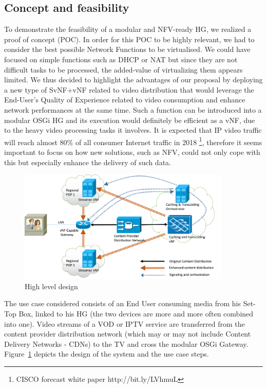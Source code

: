 \subsection{Concept and feasibility}
To demonstrate the feasibility of a modular and NFV-ready HG, we realized a proof of concept (POC).
In order for this POC to be highly relevant, we had to consider the best possible Network Functions to be virtualised.
We could have focused on simple functions such as DHCP or NAT but since they are not difficult tasks to be processed, the added-value of virtualizing them appears limited.
We thus decided to highlight the advantages of our proposal by deploying a new type of SvNF+vNF related to video distribution that would leverage the End-User's Quality of Experience related to video consumption and enhance network performances at the same time.
Such a function can be introduced into a modular OSGi HG and its execution would definitely be efficient as a vNF, due to the heavy video processing tasks it involves.
It is expected that IP video traffic will reach almost 80\% of all consumer Internet traffic in 2018 \footnote{CISCO forecast white paper http://bit.ly/LVhmuL }, therefore it seems important to focus on how new solutions, such as NFV, could not only cope with this but especially enhance the delivery of such data.

\begin{figure}
	
	\center

	\includegraphics[width=0.90\textwidth,natwidth=8132,natheight=4335]{fig/highleveldesign.png}
	\caption{ High level design
    \label{fig:hld}
    }

\end{figure}


The use case considered consists of an End User consuming media from his Set-Top Box, linked to his HG (the two devices are more and more often combined into one).
Video streams of a VOD or IPTV service are transferred from the content provider distribution network (which may or may not include Content Delivery Networks - CDNs) to the TV and cross the modular OSGi Gateway.
Figure~\ref{fig:hld} depicts the design of the system and the use case steps. 
   
